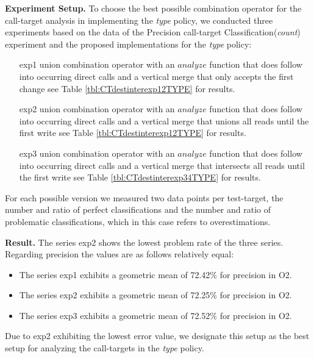 \textbf{Experiment Setup.}
To choose the best possible combination operator for the call-target analysis in implementing the \textit{type} policy, we conducted three experiments based on the data of the Precision call-target Classification(\textit{count}) experiment and the proposed implementations for the \textit{type} policy:
\begin{itemize}
\item[exp1] union combination operator with an $analyze$ function that does follow into occurring direct calls and a vertical merge that only accepts the first change see Table \ref{tbl:CTdestinterexp12TYPE} for results.
\item[exp2] union combination operator with an $analyze$ function that does follow into occurring direct calls  and a vertical merge that unions all reads until the first write see Table \ref{tbl:CTdestinterexp12TYPE} for results.
\item[exp3] union combination operator with an $analyze$ function that does follow into occurring direct calls  and a vertical merge that intersects all reads until the first write see Table \ref{tbl:CTdestinterexp34TYPE} for results.
\end{itemize}
For each possible version we measured two data points per test-target, the number and ratio of perfect classifications and the number and ratio of problematic classifications, which in this case refers to overestimations.

\textbf{Result.} The series exp2 shows the lowest problem rate of the three series. Regarding precision the values are as follows relatively equal:
\begin{itemize}
\item The series exp1 exhibits a geometric mean of 72.42\% for precision in O2.
\item The series exp2 exhibits a geometric mean of 72.25\% for precision in O2.
\item The series exp3 exhibits a geometric mean of 72.52\% for precision in O2. 
\end{itemize}
Due to exp2 exhibiting the lowest error value, we designate this setup as the best setup for analyzing the call-targets in the \textit{type} policy.

